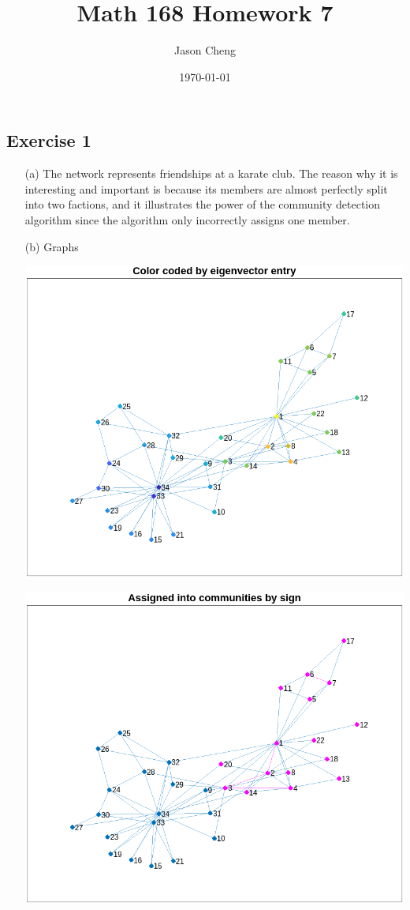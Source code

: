 \documentclass{article}
\title{Math 168 Homework 7}
\author{Jason Cheng}
\date{\today}
\begin{document}
\maketitle

\subsection*{Exercise 1}

\begin{enumerate}
  \item[(a)]
  The network represents friendships at a karate club. The reason why it is
  interesting and important is because its members are almost perfectly split
  into two factions, and it illustrates the power of the community detection
  algorithm since the algorithm only incorrectly assigns one member.

  \item[(b)]
  Graphs

  \includegraphics{color-coded.png}

  \includegraphics{assigned.png}


\end{enumerate}
\end{document}
